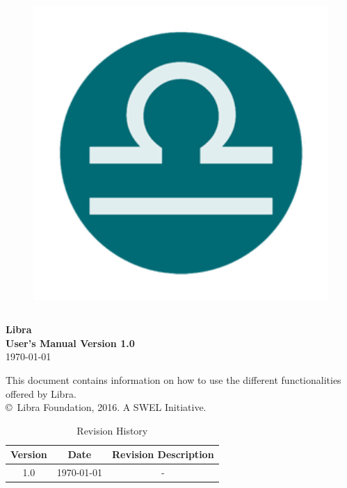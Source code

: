 \begin{titlepage}
\begin{figure}[h!]
\centering
\vspace{2cm}	%
\includegraphics[width=12cm, height=12cm]{figure/logo.png}
\end{figure}

\mbox{}
\vfill
\renewcommand{\familydefault}{\sfdefault} \normalfont %
\textbf{{\Huge 	Libra 	\\[0.5cm] 
				User's Manual Version 1.0}} 	\\[0.5cm]

{\Large \today} \setlength{\parskip}{2.9cm}

\renewcommand{\familydefault}{\rmdefault} \normalfont %
\end{titlepage}

\newpage
\thispagestyle{plain}
\vspace*{4.5cm}
This document contains information on how to
 use the different functionalities offered by Libra.\\
\copyright ~Libra Foundation, 2016. A SWEL Initiative.\setlength{\parskip}{1cm} 

\begin{table}[H]
    \centering
    \caption*{\hspace{170pt}Revision History}
    \begin{tabular}{|c|c|c|}
    \hline
        Version & Date & Revision Description \\
        \hline
         1.0 & \today & -\\
         \hline
    \end{tabular}
    \label{tab:my_label}
\end{table}

